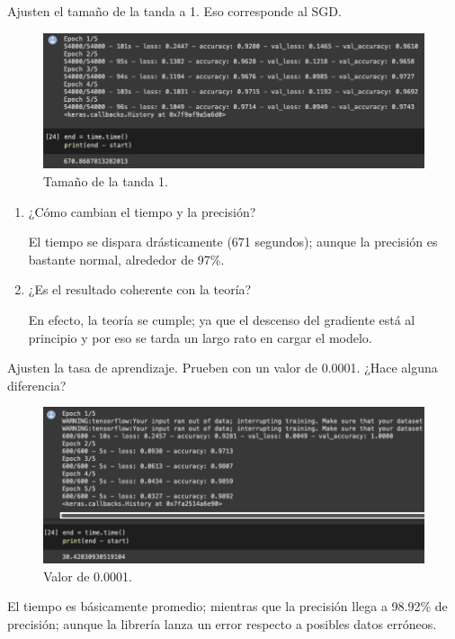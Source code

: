 \begin{problema}
	Ajusten el tamaño de la tanda a 1.  Eso corresponde al SGD.
	\begin{figure}[H]
		\centering
		\includegraphics[scale=0.5]{Images/8.png}
		\caption{Tamaño de la tanda 1.}
	\end{figure}
	\begin{enumerate}
		\item  ¿Cómo cambian el tiempo y la precisión? 
		\begin{sol}
			El tiempo se dispara drásticamente (671 segundos); aunque la precisión es bastante normal, alrededor de 97\%. 
		\end{sol}
		\item  ¿Es el resultado coherente con la teoría?
		\begin{sol}
			En efecto, la teoría se cumple; ya que el descenso del gradiente está al principio y por eso se tarda un largo rato en cargar el modelo. 
		\end{sol}
	\end{enumerate}
	
\end{problema}
\begin{problema}
	Ajusten la tasa de aprendizaje.  Prueben con un valor de 0.0001.  ¿Hace alguna diferencia?
	\begin{figure}[H]
		\centering
		\includegraphics[scale=0.5]{Images/9.png}
		\caption{Valor de 0.0001.}
	\end{figure}
	\begin{sol}
		El tiempo es básicamente promedio; mientras que la precisión llega a 98.92\% de precisión; aunque la librería lanza un error respecto  a posibles datos erróneos.  
	\end{sol}
\end{problema}
